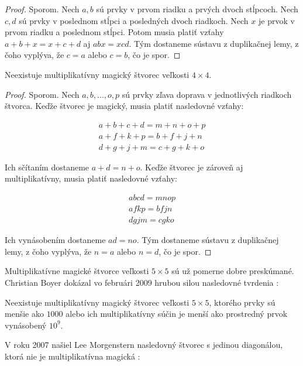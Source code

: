\begin{proof} Sporom. Nech $a,b$ sú prvky v prvom riadku a prvých dvoch stĺpcoch. Nech $c,d$ sú prvky v poslednom stĺpci a posledných dvoch riadkoch. Nech $x$ je prvok v prvom riadku a poslednom stĺpci. Potom musia platiť vzťahy $a + b + x = x + c + d$ aj $abx = xcd$. Tým dostaneme sústavu z duplikačnej lemy, z čoho vyplýva, že $c = a$ alebo $c = b$, čo je spor.
\end{proof}

\begin{theorem} Neexistuje multiplikatívny magický štvorec veľkosti $4 \times 4$.
\end{theorem} 

\begin{proof} Sporom. Nech $a, b, ... , o, p$ sú prvky zľava doprava v jednotlivých riadkoch štvorca. Keďže štvorec je magický, musia platiť nasledovné vzťahy:

\begin{gather}
a + b + c + d = m + n + o + p \\
a + f + k + p = b + f + j + n \\
d + g + j + m = c + g + k + o
\end{gather}

Ich sčítaním dostaneme $a + d = n + o$. Keďže štvorec je zároveň aj multiplikatívny, musia platiť nasledovné vzťahy:

\begin{gather}
abcd = mnop \\
afkp = bfjn \\
dgjm = cgko
\end{gather}

Ich vynásobením dostaneme $ad = no$. Tým dostaneme sústavu z duplikačnej lemy, z čoho vyplýva, že $n = a$ alebo $n = d$, čo je spor.
\end{proof}

Multiplikatívne magické štvorce veľkosti $5 \times 5$ sú už pomerne dobre preskúmané. Christian Boyer dokázal vo februári 2009 hrubou silou nasledovné tvrdenia \cite{multimagie}:
\begin{theorem} Neexistuje multiplikatívny magický štvorec veľkosti $5 \times 5$, ktorého prvky sú menšie ako $1000$ alebo ich multiplikatívny súčin je menší ako prostredný prvok vynásobený $10^9$.
\end{theorem}

V roku 2007 našiel Lee Morgenstern nasledovný štvorec s jedinou diagonálou, ktorá nie je multiplikatívna magická \cite{multimagie}: \\

